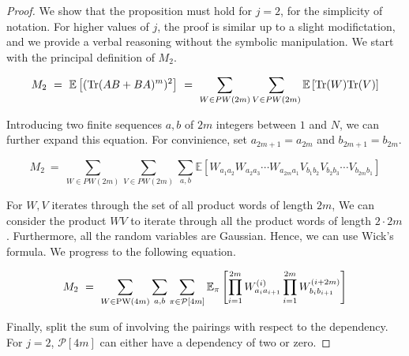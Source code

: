 \documentclass{article}
\newcommand{\Tr}{\textnormal{Tr}}
\newcommand{\PW}{\textnormal{PW}}
\newcommand{\E}{\mathbb{E}}
\begin{document}
\begin{proof}
    We show that the proposition must hold for $j = 2$, for the simplicity of 
    notation. For higher values of $j$, the proof is similar up to a slight modifictation, 
    and we provide a verbal reasoning without the symbolic manipulation.
    We start with the principal definition of $M_2$. 

    \begin{equation}
         M_2 \ = \ \E\left[(\Tr(AB + BA)^m)^2\right] 
         \ = \ 
            \sum_{W \in PW(2m)} \sum_{V \in PW(2m)}
            \E\left[\Tr(W)\Tr(V)\right]
    \end{equation}

    Introducing two finite sequences $a, b$ of $2m$ integers 
    between $1$ and $N$, we can further expand this equation. 
    For convinience, set $a_{2m + 1} = a_{2m}$ and \newline $b_{2m + 1} = b_{2m}$. 
    

    \begin{equation}
        M_2 \ =\ 
\sum_{W \in PW(2m)} \sum_{V \in PW(2m)}
        \sum_{a, b}
        \E\left[ W_{a_1a_2} W_{a_2a_3} \cdots W_{a_{2m}a_1}
            V_{b_1b_2} V_{b_2b_3} \cdots V_{b_{2m}b_1}
        \right]
    \end{equation}

For $W, V$ iterates through the set of all product words of length $2m$, 
We can consider the product $WV$ to iterate through all the product words 
of length $2 \cdot 2m$. Furthermore, all the random variables are Gaussian. 
Hence, we can use Wick's formula. We progress to the following equation. 

\begin{equation}
    M_2 \ = \ 
    \sum_{W \in \PW(4m)} \sum_{a, b} \sum_{\pi \in \mathcal{P}[4m]} 
    \E_\pi\left[
        \prod_{i = 1}^{2m} 
            W^{(i)}_{a_ia_{i + 1}}
        \prod_{i = 1}^{2m}
W^{(i + 2m)}_{b_ib_{i + 1}}
    \right] 
\end{equation}

Finally, split the sum of involving the pairings with respect to 
the dependency. For $j = 2$, $\mathcal{P}[4m]$ can either have a 
dependency of two or zero. 



\end{proof}
\end{document}
